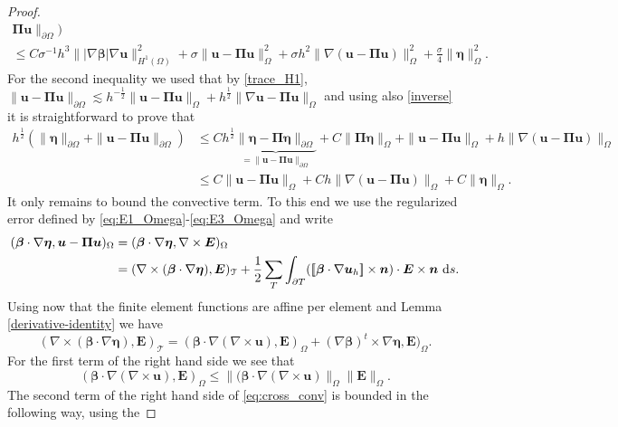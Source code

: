 \documentclass[10pt]{amsart}
\numberwithin{equation}{section}
\theoremstyle{definition}
\theoremstyle{remark}
\renewcommand{\(}{\bigl(}
\renewcommand{\)}{\bigr)}
\newcommand{\jump}[1]{\left[\hspace{-0.025in}\left[#1\right]\hspace{-0.025in}\right]}
\newcommand{\bld}[1]{\boldsymbol{#1}}
\newcommand{\bn}{\bld{n}}
\newcommand{\bu}{\bld{u}}
\newcommand{\bE}{\bld{E}}
\newcommand{\bldeta}{\bld{\eta}}
\newcommand{\bPi}{\bld{\Pi}}
\newcommand{\bbeta}{{\bm \beta}}
\begin{document}
\begin{proof}
\begin{multline*}
\bPi \bu\|_{\partial \Omega}) \\ 
\leq C \sigma^{-1} h^{3} \||\nabla
\bbeta| \nabla \bu\|_{H^1(\Omega)}^2 + \sigma\|\bu -
\bPi \bu\|^2_{\Omega} +\sigma h^2 \|\nabla (\bu -
\bPi \bu)\|^2_{\Omega}+ \frac{\sigma}{4} \| \bldeta\|_{\Omega}^2.
\end{multline*}
For the second inequality we used that by \eqref{trace_H1}, $\|\bu -
\bPi \bu\|_{\partial \Omega} \lesssim h^{-\frac12} \|\bu -
\bPi \bu\|_{\Omega} + h^{\frac12} \|\nabla \bu -
\bPi \bu\|_{\Omega}$ and using also \eqref{inverse} it is
straightforward to prove that
\begin{align*}
h^{\frac12}(\| \bldeta\|_{\partial \Omega} + \|\bu -
\bPi \bu\|_{\partial \Omega} )
&\leq C h^{\frac12} \underbrace{\| \bldeta - \bPi
\bldeta\|_{\partial \Omega} }_{= \|\bu -
\bPi \bu\|_{\partial \Omega}} + C \|
\bPi \bldeta\|_{\Omega} +  \|\bu -
\bPi \bu\|_{\Omega} + h  \|\nabla (\bu -
\bPi \bu)\|_{\Omega} 
\\
&\leq C\|\bu -
\bPi \bu\|_{\Omega} + C h  \|\nabla (\bu -
\bPi \bu)\|_{\Omega}  +  C \|
\bldeta\|_{\Omega} .
\end{align*}
It only remains to bound the convective term. To this end we use the
regularized error defined by \eqref{eq:E1_Omega}-\eqref{eq:E3_Omega}
and write
\begin{align}\label{eq:conv_pert}
(\bbeta \cdot \nabla\bldeta, \bu -
\bPi \bu)_\Omega &= (\bbeta \cdot \nabla\bldeta, \nabla \times \bE)_\Omega
\\ \nonumber
&= (\nabla \times (\bbeta \cdot \nabla \bldeta), \bE)_{\mathcal{T}}+ \frac12
\sum_T \int_{\partial T}  (\jump{\bbeta \cdot \nabla \bu_h}\times \bn) \cdot \bE \times
\bn ~\mbox{d}s.
\end{align}
Using now  that the finite element functions are affine per element
and Lemma \ref{derivative-identity} we have
\begin{equation}\label{eq:cross_conv}
(\nabla \times (\bbeta \cdot \nabla \bldeta), \bE)_{\mathcal{T}} = (\bbeta
\cdot \nabla (\nabla \times\bu), \bE)_\Omega+(\nabla \bbeta)^t\times \nabla \bldeta, \bE)_\Omega.
\end{equation}
For the first term of the right hand side we see that
\begin{equation}\label{eq:conv1}
(\bbeta
\cdot \nabla (\nabla \times\bu), \bE)_\Omega \leq \|(\bbeta
\cdot \nabla (\nabla \times\bu)\|_\Omega \|\bE\|_\Omega.
\end{equation}
The second term of the right hand side of \eqref{eq:cross_conv} is bounded in the following way, using the

\end{proof}
\end{document}
